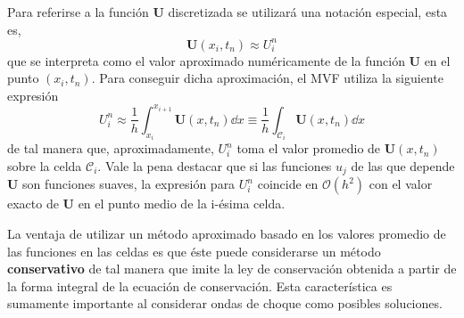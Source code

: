Para referirse a la función $\mathbf{U}$ discretizada se utilizará una notación especial, esta es,
\begin{equation}
	\mathbf{U}(x_i, t_n) \approx U_{i}^{n}
\end{equation}
que se interpreta como el valor aproximado numéricamente de la función $\mathbf{U}$ en el punto $(x_i, t_n)$. Para conseguir dicha aproximación, el MVF utiliza la siguiente expresión
\begin{equation}
	U_{i}^{n} \approx \frac{1}{h}\int_{x_i}^{x_{i+1}}\mathbf{U}(x, t_n)\dd{x} \equiv \frac{1}{h}\int_{\mathcal{C}_i}\mathbf{U}(x, t_n)\dd{x}
\end{equation}
de tal manera que, aproximadamente, $U_i^n$ toma el valor promedio de $\mathbf{U}(x,t_n)$ sobre la celda $\mathcal{C}_i$. Vale la pena destacar que si las funciones $u_j$ de las que depende $\mathbf{U}$ son funciones suaves, la expresión para $U_i^n$ coincide en $\mathcal{O}(h^2)$ con el valor exacto de $\mathbf{U}$ en el punto medio de la i-ésima celda.

La ventaja de utilizar un método aproximado basado en los valores promedio de las funciones en las celdas es que éste puede considerarse un método \textbf{conservativo} de tal manera que imite la ley de conservación obtenida a partir de la forma integral de la ecuación de conservación. Esta característica es sumamente importante al considerar ondas de choque como posibles soluciones.
